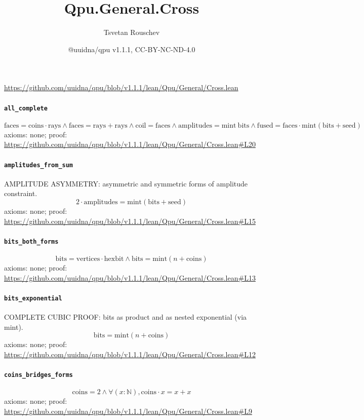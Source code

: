 \documentclass[11pt]{article}
\title{Qpu.General.Cross}
\author{Tsvetan Rouschev}
\date{@uuidna/qpu v1.1.1, CC-BY-NC-ND-4.0}
\begin{document}
\maketitle
\noindent\url{https://github.com/uuidna/qpu/blob/v1.1.1/lean/Qpu/General/Cross.lean}

\paragraph{\texttt{all\_complete}}
\[ \mathrm{faces} = \mathrm{coins} \cdot \mathrm{rays} \land \mathrm{faces} = \mathrm{rays} + \mathrm{rays} \land \mathrm{coil} = \mathrm{faces} \land \mathrm{amplitudes} = \mathrm{mint}\ \mathrm{bits} \land \mathrm{fused} = \mathrm{faces} \cdot \mathrm{mint} (\mathrm{bits} + \mathrm{seed}) \]
\noindent axioms: none; proof: \url{https://github.com/uuidna/qpu/blob/v1.1.1/lean/Qpu/General/Cross.lean\#L20}

\paragraph{\texttt{amplitudes\_from\_sum}}
AMPLITUDE ASYMMETRY: asymmetric and symmetric forms of amplitude constraint.
\[ 2 \cdot \mathrm{amplitudes} = \mathrm{mint} (\mathrm{bits} + \mathrm{seed}) \]
\noindent axioms: none; proof: \url{https://github.com/uuidna/qpu/blob/v1.1.1/lean/Qpu/General/Cross.lean\#L15}

\paragraph{\texttt{bits\_both\_forms}}
\[ \mathrm{bits} = \mathrm{vertices} \cdot \mathrm{hexbit} \land \mathrm{bits} = \mathrm{mint} (n + \mathrm{coins}) \]
\noindent axioms: none; proof: \url{https://github.com/uuidna/qpu/blob/v1.1.1/lean/Qpu/General/Cross.lean\#L13}

\paragraph{\texttt{bits\_exponential}}
COMPLETE CUBIC PROOF: bits as product and as nested exponential (via mint).
\[ \mathrm{bits} = \mathrm{mint} (n + \mathrm{coins}) \]
\noindent axioms: none; proof: \url{https://github.com/uuidna/qpu/blob/v1.1.1/lean/Qpu/General/Cross.lean\#L12}

\paragraph{\texttt{coins\_bridges\_forms}}
\[ \mathrm{coins} = 2 \land \forall (x : \mathbb{N}), \mathrm{coins} \cdot x = x + x \]
\noindent axioms: none; proof: \url{https://github.com/uuidna/qpu/blob/v1.1.1/lean/Qpu/General/Cross.lean\#L9}
\end{document}
